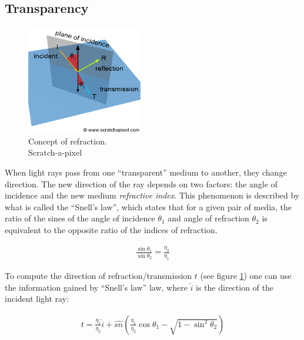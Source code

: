 \documentclass{article}
\begin{document}
\subsection{Transparency}
\begin{figure}
	\centering
	\includegraphics[width=0.45\textwidth]{snell_law_concept}
	\caption{Concept of refraction. \\ Scratch-a-pixel}
	\label{fig:concept_refraction}
\end{figure}

When light rays pass from one ``transparent'' medium to another, they change direction. The new direction of the ray depends on two factors: the angle of incidence and the new medium \textit{refractive index}. This phenomenon is described by what is called the ``Snell's law'', which states that for a given pair of media, the ratio of the sines of the angle of incidence $\theta_{1}$ and angle of refraction $\theta_{2}$ is equivalent to the opposite ratio of the indices of refraction.

\begin{align}
\frac{\sin \theta_{1}}{\sin \theta_{2}} = \frac{\eta_{2}}{\eta_{1}}
\end{align}

To compute the direction of refraction/transmission $t$ (see figure \ref{fig:concept_refraction}) one can use the information gained by ``Snell's law'' law, where $\hat{i}$ is the direction of the incident light ray:

\begin{align}
t = \frac{\eta_{1}}{\eta_{2}}\hat{i} + \hat{sn}(\frac{\eta_{1}}{\eta_{2}}\cos \theta_{1} - \sqrt{1 - \sin^{2} \theta_{2}})
\end{align}
\end{document}
